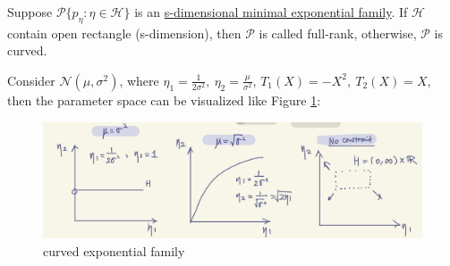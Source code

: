 \begin{definition}
    Suppose $\mathcal{P}\{p_\eta:\eta\in\mathcal{H}\}$ is an \underline{s-dimensional minimal exponential family}.
    If $\mathcal{H}$ contain open rectangle (s-dimension), then $\mathcal{P}$ is called full-rank, 
    otherwise, $\mathcal{P}$ is curved.
\end{definition}

\begin{example}
    Consider $\mathcal{N}(\mu,\sigma^2)$, where $\eta_1=\frac{1}{2\sigma^2},~\eta_2=\frac{\mu}{\sigma^2}$,
    $T_1(X)=-X^2,~T_2(X)=X$, 
    then the parameter space can be visualized like Figure \ref{fig:fullrank_curved}:
\end{example}
\begin{figure}[hptb]
    \centering
    \includegraphics[width=\textwidth]{figures/fullrank-curved.png}
    \caption{curved exponential family}
    \label{fig:fullrank_curved}
\end{figure}

